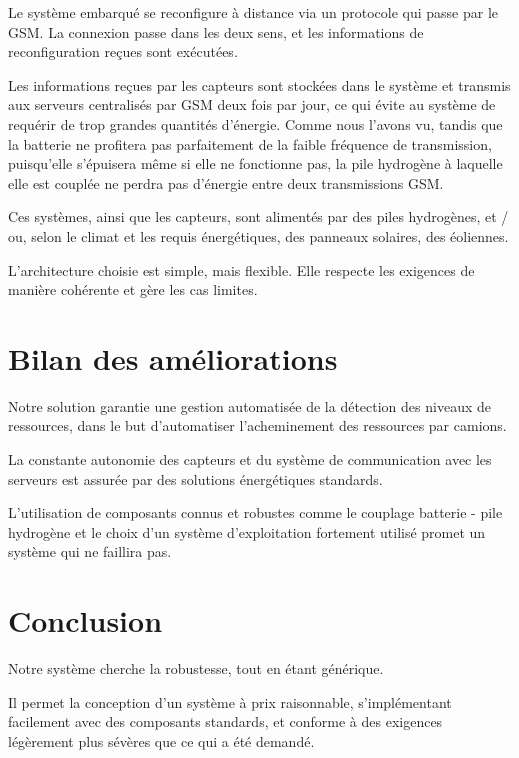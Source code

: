 Le système embarqué se reconfigure à distance via un protocole qui passe par le GSM. La connexion passe dans les deux sens, et les informations de reconfiguration reçues sont exécutées.

Les informations reçues par les capteurs sont stockées dans le système et transmis aux serveurs centralisés par GSM deux fois par jour, ce qui évite au système de requérir de trop grandes quantités d’énergie. Comme nous l’avons vu, tandis que la batterie ne profitera pas parfaitement de la faible fréquence de transmission, puisqu’elle s’épuisera même si elle ne fonctionne pas, la pile hydrogène à laquelle elle est couplée ne perdra pas d’énergie entre deux transmissions GSM.

Ces systèmes, ainsi que les capteurs, sont alimentés par des piles hydrogènes, et / ou, selon le climat et les requis énergétiques, des panneaux solaires, des éoliennes.

L’architecture choisie est simple, mais flexible. Elle respecte les exigences de manière cohérente et gère les cas limites.

\section{Bilan des améliorations}

Notre solution garantie une gestion automatisée de la détection des niveaux de ressources, dans le but d’automatiser l’acheminement des ressources par camions.

La constante autonomie des capteurs et du système de communication avec les serveurs est assurée par des solutions énergétiques standards.

L’utilisation de composants connus et robustes comme le couplage batterie - pile hydrogène et le choix d’un système d’exploitation fortement utilisé promet un système qui ne faillira pas.

\section{Conclusion}

Notre système cherche la robustesse, tout en étant générique.

Il permet la conception d’un système à prix raisonnable, s’implémentant facilement avec des composants standards, et conforme à des exigences légèrement plus sévères que ce qui a été demandé.

